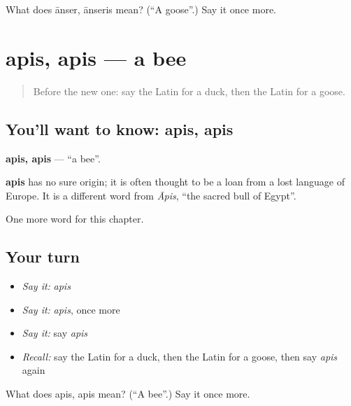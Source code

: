 \begin{tcolorbox}[breakable,colback=teal!4,colframe=teal!35!black,title={Before you move on}]
What does ānser, ānseris mean? (\textquotedblleft{}A goose\textquotedblright{}.) Say it once more.
\end{tcolorbox}
\section[apis, apis]{apis, apis — a bee}

\label{lesson:LA-C132-apis}



\begin{quote}
Before the new one: say the Latin for a duck, then the Latin for a goose.
\end{quote}

\subsection*{You'll want to know: apis, apis}
\textbf{apis, apis} — \textquotedblleft{}a bee\textquotedblright{}.

\begin{cousinweb}
\textbf{apis} has no sure origin; it is often thought to be a loan from a lost language of Europe. It is a different word from \emph{Āpis}, \textquotedblleft{}the sacred bull of Egypt\textquotedblright{}.
\end{cousinweb}

\begin{grammarlens}[title={What you've built}]
One more word for this chapter.
\end{grammarlens}

\subsection*{Your turn}
\begin{itemize}
\raggedright
  \item \emph{Say it:} \emph{apis}
  \item \emph{Say it:} \emph{apis}, once more
  \item \emph{Say it:} say \emph{apis}
  \item \emph{Recall:} say the Latin for a duck, then the Latin for a goose, then say \emph{apis} again
\end{itemize}

\begin{tcolorbox}[breakable,colback=teal!4,colframe=teal!35!black,title={Before you move on}]
What does apis, apis mean? (\textquotedblleft{}A bee\textquotedblright{}.) Say it once more.
\end{tcolorbox}
